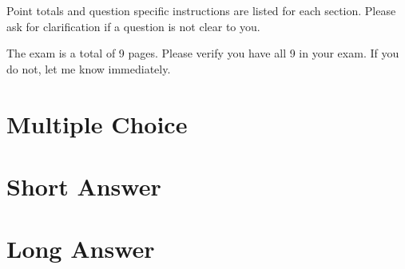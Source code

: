 \documentclass{article}
\begin{document}
Point totals and question specific instructions are listed for each section.
Please ask for clarification if a question is not clear to you.

\vspace{0.25in}

The exam is a total of 9 pages.
Please verify you have all 9 in your exam. 
If you do not, let me know immediately.

\newpage


\section*{Multiple Choice}



\newpage

\section*{Short Answer}





\newpage



\newpage



\newpage

\section*{Long Answer}



\end{document}
